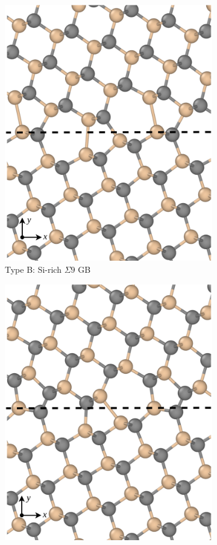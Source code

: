 \documentclass[%
preprint,
amsmath,amssymb,
aps,
]{revtex4-2}
\newcommand{\?}{\stackrel{?}{=}}
\begin{document}
\begin{figure}[h!]
\begin{subfigure}{0.3\textwidth}
 \includegraphics[width=\textwidth]{S9-2.png}
 \caption{Type B: Si-rich $\Sigma 9$ GB}
 \label{Fig:S9-B}
\end{subfigure}
\hfill
\begin{subfigure}{0.3\textwidth}
 \includegraphics[width=\textwidth]{S9-3.png}

\end{subfigure}
\end{figure}
\end{document}
